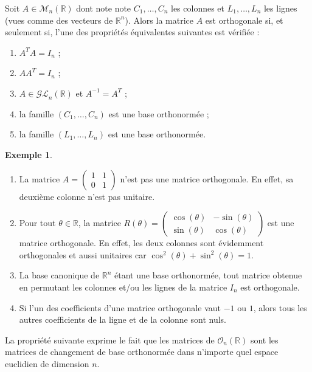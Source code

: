 \documentclass[french]{article}
\newcommand{\R}{\mathbb{R}}
\newcommand{\inv}{^{-1}}
\theoremstyle{plain}
\theoremstyle{definition}
\newtheorem*{ex}{Exemple}
\theoremstyle{remark}
\begin{document}
\begin{prop}
	Soit $A\in\mathcal{M}_n(\R)$ dont note note $C_1,\ldots,C_n$ les colonnes et $L_1,\ldots,L_n$ les lignes (vues comme des vecteurs de $\R^n$). Alors la matrice $A$ est orthogonale si, et seulement si, l'une des propriétés équivalentes suivantes est vérifiée :
	\begin{enumerate}[label=(\roman*)]
		\item $A^TA=I_n$ ;
		\item $AA^T=I_n$ ;
		\item $A\in\mathcal{GL}_n(\R)$ et $A\inv=A^T$ ;
		\item la famille $(C_1,\ldots,C_n)$ est une base orthonormée ;
		\item la famille $(L_1,\ldots,L_n)$ est une base orthonormée.
	\end{enumerate}
\end{prop}

\begin{ex}
	\begin{enumerate}
		\item La matrice $A=\displaystyle\begin{pmatrix}
			1&1\\
			0&1
		\end{pmatrix}$ n'est pas une matrice orthogonale. En effet, sa deuxième colonne n'est pas unitaire.
		\item Pour tout $\theta\in\R$, la matrice $R(\theta)=\displaystyle\begin{pmatrix}
			\cos(\theta)&-\sin(\theta)\\
			\sin(\theta)&\cos(\theta)
		\end{pmatrix}$ est une matrice orthogonale. En effet, les deux colonnes sont évidemment orthogonales et aussi unitaires car $\cos^2(\theta)+\sin^2(\theta)=1$.
		\item La base canonique de $\R^n$ étant une base orthonormée, tout matrice obtenue en permutant les colonnes et/ou les lignes de la matrice $I_n$ est orthogonale.
		\item Si l'un des coefficients d'une matrice orthogonale vaut $-1$ ou $1$, alors tous les autres coefficients de la ligne et de la colonne sont nuls.
	\end{enumerate}
\end{ex}

La propriété suivante exprime le fait que les matrices de $\mathcal{O}_n(\R)$ sont les matrices de changement de base orthonormée dans n'importe quel espace euclidien de dimension $n$.
\end{document}
